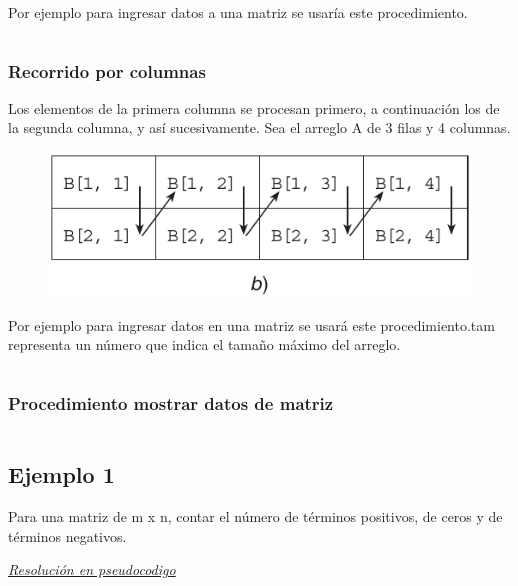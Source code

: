 \documentclass{article}
\begin{document}
Por ejemplo para ingresar datos a una matriz se usaría este procedimiento.

\inputminted{./pseudocode.py:PseudocodeLexer -x}{./pseudocodigo/recorrido_filas.algo}

\subsubsection*{Recorrido por columnas}%
Los elementos de la primera columna se procesan primero, a continuación los de
la segunda columna, y así sucesivamente. Sea el arreglo A de 3 filas y 4
columnas.

\begin{figure}[h!]
  \centering
  \includegraphics[scale=0.75]{./pictures/recorrido_columna.png}
\end{figure}

Por ejemplo para ingresar datos en una matriz se usará este
procedimiento.\footnotesize{tam representa un número que indica el tamaño
máximo del arreglo.}

\inputminted{./pseudocode.py:PseudocodeLexer -x}{./pseudocodigo/recorrido_columnas.algo}


\subsubsection*{Procedimiento mostrar datos de matriz}%
\inputminted{./pseudocode.py:PseudocodeLexer -x}{./pseudocodigo/mostrar_datos_matriz.algo}

\subsection*{Ejemplo 1}%
Para una matriz de m x n, contar el número de términos positivos, de ceros y de
términos negativos.

\underline{\textit{Resolución en pseudocodigo}}\\
\inputminted{./pseudocode.py:PseudocodeLexer -x}{./pseudocodigo/001_ejemplo.algo}
\end{document}
